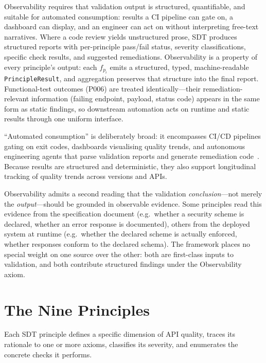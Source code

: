 Observability requires that validation output is structured, quantifiable, and suitable for automated consumption: results a CI pipeline can gate on, a dashboard can display, and an engineer can act on without interpreting free-text narratives. Where a code review yields unstructured prose, SDT produces structured reports with per-principle pass/fail status, severity classifications, specific check results, and suggested remediations. Observability is a property of every principle's output: each $f_{p_i}$ emits a structured, typed, machine-readable \texttt{PrincipleResult}, and aggregation preserves that structure into the final report. Functional-test outcomes (P006) are treated identically---their remediation-relevant information (failing endpoint, payload, status code) appears in the same form as static findings, so downstream automation acts on runtime and static results through one uniform interface.

``Automated consumption'' is deliberately broad: it encompasses CI/CD pipelines gating on exit codes, dashboards visualising quality trends, and autonomous engineering agents that parse validation reports and generate remediation code~\cite{swe-agent, devin-cognition}. Because results are structured and deterministic, they also support longitudinal tracking of quality trends across versions and APIs.

Observability admits a second reading that the validation \emph{conclusion}---not merely the \emph{output}---should be grounded in observable evidence. Some principles read this evidence from the specification document (e.g.\ whether a security scheme is declared, whether an error response is documented), others from the deployed system at runtime (e.g.\ whether the declared scheme is actually enforced, whether responses conform to the declared schema). The framework places no special weight on one source over the other: both are first-class inputs to validation, and both contribute structured findings under the Observability axiom.

\section{The Nine Principles}
\label{sec:nine-principles}

Each SDT principle defines a specific dimension of API quality, traces its rationale to one or more axioms, classifies its severity, and enumerates the concrete checks it performs.

